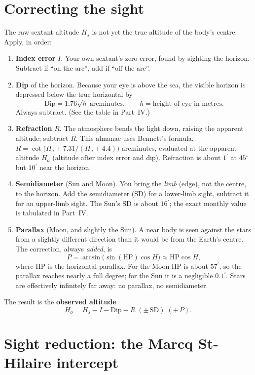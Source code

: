 \documentclass[10pt,letterpaper,twoside]{book}
\newcommand{\dg}{\ensuremath{{}^{\circ}}}
\newcommand{\pr}{\ensuremath{{}^{\prime}}}
\begin{document}
\chapter{Correcting the sight}

The raw sextant altitude $H_s$ is not yet the true altitude of the body's centre.
Apply, in order:

\begin{enumerate}[nosep]
\item \textbf{Index error} $I$. Your own sextant's zero error, found by sighting
      the horizon. Subtract if ``on the arc'', add if ``off the arc''.
\item \textbf{Dip} of the horizon. Because your eye is above the sea, the visible
      horizon is depressed below the true horizontal by
      \[ \text{Dip} = 1.76\sqrt{h}\ \text{arcminutes}, \qquad h=\text{height of eye in metres.} \]
      Always subtract. (See the table in Part~IV.)
\item \textbf{Refraction} $R$. The atmosphere bends the light down, raising the
      apparent altitude; subtract $R$. This almanac uses Bennett's formula,
      $R = \cot\!\big(H_a + 7.31/(H_a+4.4)\big)$ arcminutes, evaluated at the
      apparent altitude $H_a$ (altitude after index error and dip). Refraction is
      about $1\pr$ at $45\dg$ but $10\pr$ near the horizon.
\item \textbf{Semidiameter} (Sun and Moon). You bring the \emph{limb} (edge), not
      the centre, to the horizon. Add the semidiameter (SD) for a lower-limb sight,
      subtract it for an upper-limb sight. The Sun's SD is about $16\pr$; the exact
      monthly value is tabulated in Part~IV.
\item \textbf{Parallax} (Moon, and slightly the Sun). A near body is seen against
      the stars from a slightly different direction than it would be from the
      Earth's centre. The correction, always \emph{added}, is
      \[ P = \arcsin\!\big(\sin(\mathrm{HP})\cos H\big) \approx \mathrm{HP}\cos H, \]
      where HP is the horizontal parallax. For the Moon HP is about $57\pr$, so the
      parallax reaches nearly a full degree; for the Sun it is a negligible
      $0.1\pr$. Stars are effectively infinitely far away: no parallax, no
      semidiameter.
\end{enumerate}

The result is the \textbf{observed altitude}
\[
  H_o = H_s - I - \text{Dip} - R \;(\pm\,\text{SD})\;(+\,P).
\]

\chapter{Sight reduction: the Marcq St-Hilaire intercept}
\end{document}

